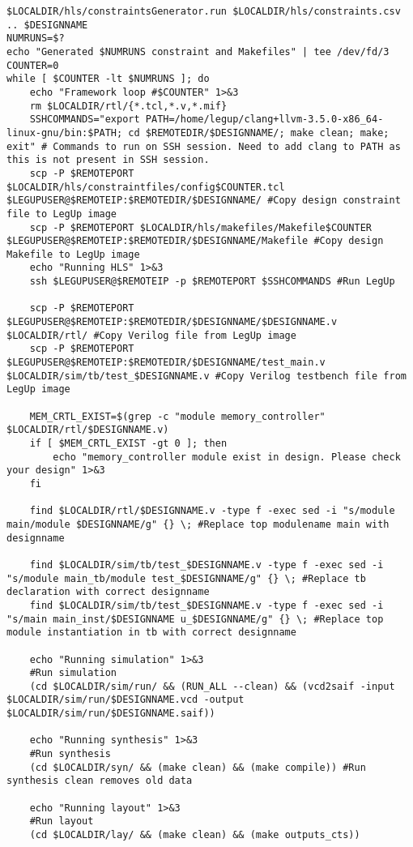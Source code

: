 \begin{lstlisting}[caption={HLS Script source code},label=lst:hlsscriptsourcecode]
$LOCALDIR/hls/constraintsGenerator.run $LOCALDIR/hls/constraints.csv .. $DESIGNNAME
NUMRUNS=$?
echo "Generated $NUMRUNS constraint and Makefiles" | tee /dev/fd/3
COUNTER=0
while [ $COUNTER -lt $NUMRUNS ]; do
	echo "Framework loop #$COUNTER" 1>&3
	rm $LOCALDIR/rtl/{*.tcl,*.v,*.mif}
	SSHCOMMANDS="export PATH=/home/legup/clang+llvm-3.5.0-x86_64-linux-gnu/bin:$PATH; cd $REMOTEDIR/$DESIGNNAME/; make clean; make; exit" # Commands to run on SSH session. Need to add clang to PATH as this is not present in SSH session.
	scp -P $REMOTEPORT $LOCALDIR/hls/constraintfiles/config$COUNTER.tcl $LEGUPUSER@$REMOTEIP:$REMOTEDIR/$DESIGNNAME/ #Copy design constraint file to LegUp image
	scp -P $REMOTEPORT $LOCALDIR/hls/makefiles/Makefile$COUNTER $LEGUPUSER@$REMOTEIP:$REMOTEDIR/$DESIGNNAME/Makefile #Copy design Makefile to LegUp image
	echo "Running HLS" 1>&3
	ssh $LEGUPUSER@$REMOTEIP -p $REMOTEPORT $SSHCOMMANDS #Run LegUp
	
	scp -P $REMOTEPORT $LEGUPUSER@$REMOTEIP:$REMOTEDIR/$DESIGNNAME/$DESIGNNAME.v $LOCALDIR/rtl/ #Copy Verilog file from LegUp image
	scp -P $REMOTEPORT $LEGUPUSER@$REMOTEIP:$REMOTEDIR/$DESIGNNAME/test_main.v $LOCALDIR/sim/tb/test_$DESIGNNAME.v #Copy Verilog testbench file from LegUp image
	
	MEM_CRTL_EXIST=$(grep -c "module memory_controller" $LOCALDIR/rtl/$DESIGNNAME.v)
	if [ $MEM_CRTL_EXIST -gt 0 ]; then
		echo "memory_controller module exist in design. Please check your design" 1>&3
	fi
	
	find $LOCALDIR/rtl/$DESIGNNAME.v -type f -exec sed -i "s/module main/module $DESIGNNAME/g" {} \; #Replace top modulename main with designname
	
	find $LOCALDIR/sim/tb/test_$DESIGNNAME.v -type f -exec sed -i "s/module main_tb/module test_$DESIGNNAME/g" {} \; #Replace tb declaration with correct designname
	find $LOCALDIR/sim/tb/test_$DESIGNNAME.v -type f -exec sed -i "s/main main_inst/$DESIGNNAME u_$DESIGNNAME/g" {} \; #Replace top module instantiation in tb with correct designname
	
	echo "Running simulation" 1>&3
	#Run simulation
	(cd $LOCALDIR/sim/run/ && (RUN_ALL --clean) && (vcd2saif -input $LOCALDIR/sim/run/$DESIGNNAME.vcd -output $LOCALDIR/sim/run/$DESIGNNAME.saif)) 
	
	echo "Running synthesis" 1>&3
	#Run synthesis
	(cd $LOCALDIR/syn/ && (make clean) && (make compile)) #Run synthesis clean removes old data
	
	echo "Running layout" 1>&3
	#Run layout
	(cd $LOCALDIR/lay/ && (make clean) && (make outputs_cts))
	

\end{lstlisting}
